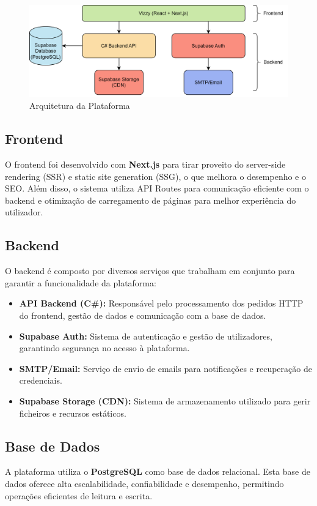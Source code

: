 \documentclass[a4paper, 12pt]{article} %
\begin{document}
\begin{figure}[ht]
	\centering
	\includegraphics[width=\textwidth]{../images/system-architecture.png}
	\caption{Arquitetura da Plataforma}
	\label{fig:arquitetura}
\end{figure}

\subsection{Frontend}
O frontend foi desenvolvido com \textbf{Next.js} para tirar proveito do server-side rendering (SSR) e static site generation (SSG), o que melhora o desempenho e o SEO. Além disso, o sistema utiliza API Routes para comunicação eficiente com o backend e otimização de carregamento de páginas para melhor experiência do utilizador.

\subsection{Backend}
O backend é composto por diversos serviços que trabalham em conjunto para garantir a funcionalidade da plataforma:

\begin{itemize}
	\item \textbf{API Backend (C\#):} Responsável pelo processamento dos pedidos HTTP do frontend, gestão de dados e comunicação com a base de dados.
	\item \textbf{Supabase Auth:} Sistema de autenticação e gestão de utilizadores, garantindo segurança no acesso à plataforma.
	\item \textbf{SMTP/Email:} Serviço de envio de emails para notificações e recuperação de credenciais.
	\item \textbf{Supabase Storage (CDN):} Sistema de armazenamento utilizado para gerir ficheiros e recursos estáticos.
\end{itemize}

\subsection{Base de Dados}
A plataforma utiliza o \textbf{PostgreSQL} como base de dados relacional. Esta base de dados oferece alta escalabilidade, confiabilidade e desempenho, permitindo operações eficientes de leitura e escrita.
\end{document}
